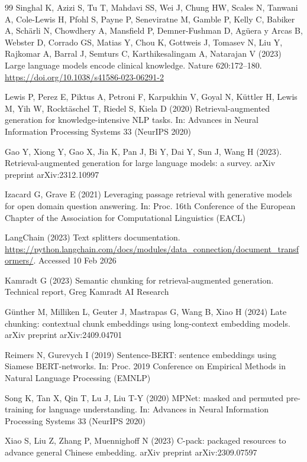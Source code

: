 \documentclass[pdflatex,sn-mathphys-num]{sn-jnl}
\theoremstyle{thmstyleone}
\theoremstyle{thmstyletwo}
\theoremstyle{thmstylethree}
\begin{document}
\begin{thebibliography}{99}
Singhal K, Azizi S, Tu T, Mahdavi SS, Wei J, Chung HW, Scales N, Tanwani A, Cole-Lewis H, Pfohl S, Payne P, Seneviratne M, Gamble P, Kelly C, Babiker A, Sch\"{a}rli N, Chowdhery A, Mansfield P, Demner-Fushman D, Ag\"{u}era y Arcas B, Webster D, Corrado GS, Matias Y, Chou K, Gottweis J, Tomasev N, Liu Y, Rajkomar A, Barral J, Semturs C, Karthikesalingam A, Natarajan V (2023) Large language models encode clinical knowledge. Nature 620:172--180. \url{https://doi.org/10.1038/s41586-023-06291-2}

Lewis P, Perez E, Piktus A, Petroni F, Karpukhin V, Goyal N, K\"{u}ttler H, Lewis M, Yih W, Rockt\"{a}schel T, Riedel S, Kiela D (2020) Retrieval-augmented generation for knowledge-intensive NLP tasks. In: Advances in Neural Information Processing Systems 33 (NeurIPS 2020)

Gao Y, Xiong Y, Gao X, Jia K, Pan J, Bi Y, Dai Y, Sun J, Wang H (2023). Retrieval-augmented generation for large language models: a survey. arXiv preprint arXiv:2312.10997

Izacard G, Grave E (2021) Leveraging passage retrieval with generative models for open domain question answering. In: Proc. 16th Conference of the European Chapter of the Association for Computational Linguistics (EACL)

LangChain (2023) Text splitters documentation. \url{https://python.langchain.com/docs/modules/data_connection/document_transformers/}. Accessed 10 Feb 2026

Kamradt G (2023) Semantic chunking for retrieval-augmented generation. Technical report, Greg Kamradt AI Research

G\"{u}nther M, Milliken L, Geuter J, Mastrapas G, Wang B, Xiao H (2024) Late chunking: contextual chunk embeddings using long-context embedding models. arXiv preprint arXiv:2409.04701

Reimers N, Gurevych I (2019) Sentence-BERT: sentence embeddings using Siamese BERT-networks. In: Proc. 2019 Conference on Empirical Methods in Natural Language Processing (EMNLP)

Song K, Tan X, Qin T, Lu J, Liu T-Y (2020) MPNet: masked and permuted pre-training for language understanding. In: Advances in Neural Information Processing Systems 33 (NeurIPS 2020)

Xiao S, Liu Z, Zhang P, Muennighoff N (2023) C-pack: packaged resources to advance general Chinese embedding. arXiv preprint arXiv:2309.07597


\end{thebibliography}
\end{document}
